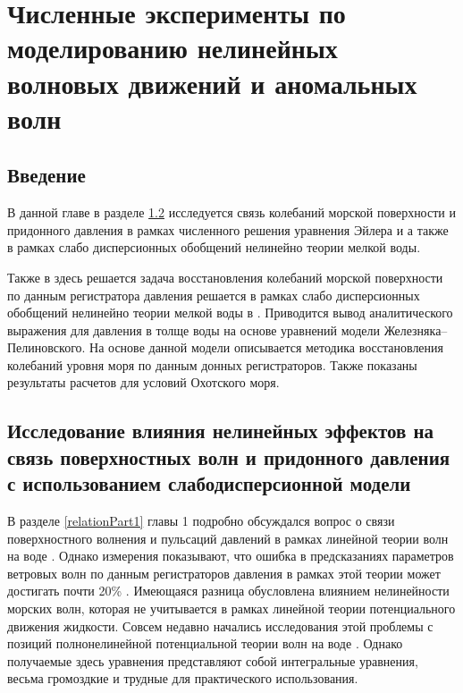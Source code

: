 \chapter{Численные эксперименты по моделированию нелинейных волновых движений и аномальных волн} \label{chapt3}

\section{Введение} \label{sect3_0}

В данной главе в разделе \ref{relationPart3} исследуется связь колебаний морской поверхности и придонного давления в рамках численного решения уравнения Эйлера и а также в рамках слабо дисперсионных обобщений нелинейно теории мелкой воды.

Также в здесь решается задача восстановления колебаний морской поверхности по данным регистратора давления решается в рамках слабо дисперсионных обобщений нелинейно теории мелкой воды в \cite{Green_1976, Zhel_Pel_1985, Fedotova_2008, Fedotova_2012}. Приводится вывод аналитического выражения для давления в толще воды на основе уравнений модели Железняка--Пелиновского. На основе данной модели описывается методика восстановления колебаний уровня моря по данным донных регистраторов. Также показаны результаты расчетов для условий Охотского моря.


\section{Исследование влияния нелинейных эффектов на связь поверхностных волн и придонного давления с использованием слабодисперсионной модели}\label{relationPart3}

В разделе \ref{relationPart1} главы 1 подробно обсуждался вопрос о связи поверхностного волнения и пульсаций давлений в рамках линейной теории волн на воде \cite{Kuo_Chiu_1994, Zasl_Kras_2001, Tsai_Huang_2005, Baqueizo_Losada_1995, Huang_Tsai_2008}. Однако измерения показывают, что ошибка в предсказаниях параметров ветровых волн по данным регистраторов давления в рамках этой теории может достигать почти 20\% \cite{Bishop_Donelan_1987}. Имеющаяся разница обусловлена влиянием нелинейности морских волн, которая не учитывается в рамках линейной теории потенциального движения жидкости. Совсем недавно начались исследования этой проблемы с позиций полнонелинейной потенциальной теории волн на воде \cite{Esher_Schlurmann_2008, Constantin_Strauss_2010, Constantin_Esher_Hsu2011, Constantin_2012, Oliveras_2012, Deconink_2012}. Однако получаемые здесь уравнения представляют собой интегральные уравнения, весьма громоздкие и трудные для практического использования.


